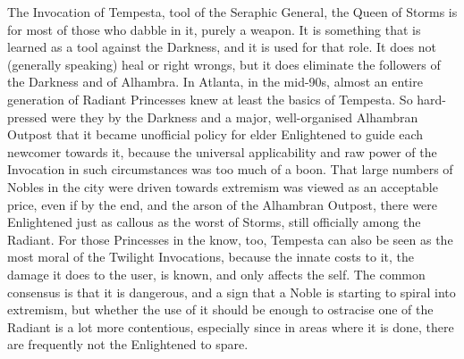 {The Invocation of Tempesta, tool of the Seraphic General, the Queen of Storms is for most of those who dabble in it, purely a weapon. It is something that is learned as a tool against the Darkness, and it is used for that role. It does not (generally speaking) heal or right wrongs, but it does eliminate the followers of the Darkness and of Alhambra. In Atlanta, in the mid-90s, almost an entire generation of Radiant Princesses knew at least the basics of Tempesta. So hard-pressed were they by the Darkness and a major, well-organised Alhambran Outpost that it became unofficial policy for elder Enlightened to guide each newcomer towards it, because the universal applicability and raw power of the Invocation in such circumstances was too much of a boon. That large numbers of Nobles in the city were driven towards extremism was viewed as an acceptable price, even if by the end, and the arson of the Alhambran Outpost, there were Enlightened just as callous as the worst of Storms, still officially among the Radiant.
 For those Princesses in the know, too, Tempesta can also be seen as the most moral of the Twilight Invocations, because the innate costs to it, the damage it does to the user, is known, and only affects the self. The common consensus is that it is dangerous, and a sign that a Noble is starting to spiral into extremism, but whether the use of it should be enough to ostracise one of the Radiant is a lot more contentious, especially since in areas where it is done, there are frequently not the Enlightened to spare.

\vspace{4 mm}

}
